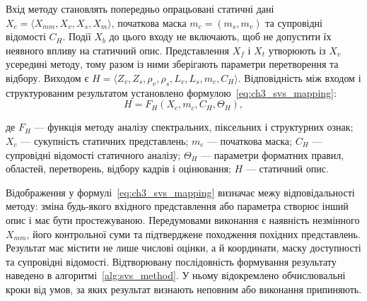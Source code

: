 Вхід методу становлять попередньо опрацьовані статичні дані $X_c=\langle X_{mm},\allowbreak X_v,\allowbreak X_s,\allowbreak X_m\rangle$, початкова маска $m_c=(m_s,m_v)$ та супровідні відомості $C_H$. Події $X_b$ до цього входу не включають, щоб не допустити їх неявного впливу на статичний опис. Представлення $X_f$ і $X_t$ утворюють із $X_v$ усередині методу, тому разом із ними зберігають параметри перетворення та відбору. Виходом є $H=\langle Z_v,\allowbreak Z_s,\allowbreak\rho_v,\allowbreak\rho_s,\allowbreak L_v,\allowbreak L_s,\allowbreak m_c,\allowbreak C_H\rangle$. Відповідність між входом і структурованим результатом установлено формулою~\eqref{eq:ch3_svs_mapping}:
\begin{equation}
H=F_H(X_c,m_c,C_H,\Theta_H),
\label{eq:ch3_svs_mapping}
\end{equation}

де $F_H$ --- функція методу аналізу спектральних, піксельних і структурних ознак; $X_c$ --- сукупність статичних представлень; $m_c$ --- початкова маска; $C_H$ --- супровідні відомості статичного аналізу; $\Theta_H$ --- параметри форматних правил, областей, перетворень, відбору кадрів і оцінювання; $H$ --- статичний опис.

Відображення у формулі~\eqref{eq:ch3_svs_mapping} визначає межу відповідальності методу: зміна будь-якого вхідного представлення або параметра створює інший опис і має бути простежуваною. Передумовами виконання є наявність незмінного $X_{mm}$, його контрольної суми та підтверджене походження похідних представлень. Результат має містити не лише числові оцінки, а й координати, маску доступності та супровідні відомості. Відтворювану послідовність формування результату наведено в алгоритмі~\ref{alg:svs_method}. У ньому відокремлено обчислювальні кроки від умов, за яких результат визнають неповним або виконання припиняють.

